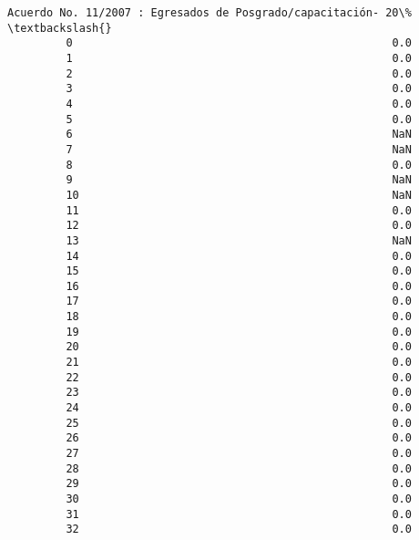 \documentclass[11pt]{article}
\begin{document}
\begin{Verbatim}[commandchars=\\\{\}]
             Acuerdo No. 11/2007 : Egresados de Posgrado/capacitación- 20\%  \textbackslash{}
         0                                                 0.0               
         1                                                 0.0               
         2                                                 0.0               
         3                                                 0.0               
         4                                                 0.0               
         5                                                 0.0               
         6                                                 NaN               
         7                                                 NaN               
         8                                                 0.0               
         9                                                 NaN               
         10                                                NaN               
         11                                                0.0               
         12                                                0.0               
         13                                                NaN               
         14                                                0.0               
         15                                                0.0               
         16                                                0.0               
         17                                                0.0               
         18                                                0.0               
         19                                                0.0               
         20                                                0.0               
         21                                                0.0               
         22                                                0.0               
         23                                                0.0               
         24                                                0.0               
         25                                                0.0               
         26                                                0.0               
         27                                                0.0               
         28                                                0.0               
         29                                                0.0               
         30                                                0.0               
         31                                                0.0               
         32                                                0.0               

\end{Verbatim}
\end{document}
